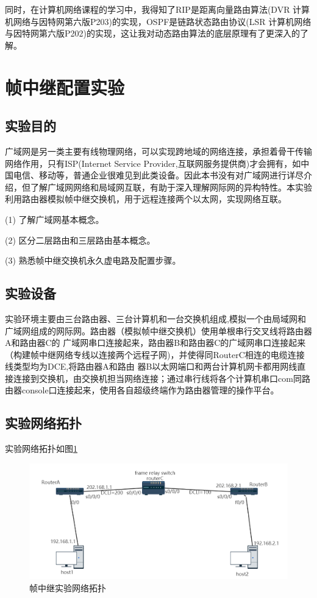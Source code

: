 \documentclass[lang=cn,11pt,a4paper,cite=authoryear]{elegantpaper}
\begin{document}
同时，在计算机网络课程的学习中，我得知了RIP是距离向量路由算法(DVR 计算机网络与因特网第六版P203)的实现，OSPF是链路状态路由协议(LSR 计算机网络与因特网第六版P202)的实现，这让我对动态路由算法的底层原理有了更深入的了解。

\section{帧中继配置实验}
\subsection{实验目的}

广域网是另一类主要有线物理网络，可以实现跨地域的网络连接，承担着骨干传输网络作用，只有ISP(Internet Service Provider,互联网服务提供商)才会拥有，如中国电信、移动等，普通企业很难见到此类设备。因此本书没有对广域网进行详尽介绍，但了解广域网网络和局域网互联，有助于深入理解网际网的异构特性。本实验利用路由器模拟帧中继交换机，用于远程连接两个以太网，实现网络互联。

(1)	了解广域网基本概念。

(2)	区分二层路由和三层路由基本概念。

(3)	熟悉帧中继交换机永久虚电路及配置步骤。

\subsection{实验设备}

实验环境主要由三台路由器、三台计算机和一台交换机组成,模拟一个由局域网和广域网组成的网际网。路由器（模拟帧中继交换机）使用单根串行交叉线将路由器A和路由器C的 广域网串口连接起来，路由器B和路由器C的广域网串口连接起来（构建帧中继网络专线以连接两个远程子网)，并使得同RouterC相连的电缆连接线类型均为DCE,将路由器A和路由 器B以太网端口和两台计算机网卡都用网线直接连接到交换机，由交换机担当网络连接；通过串行线将各个计算机串口com同路由器console口连接起来，使用各自超级终端作为路由器管理的操作平台。

\subsection{实验网络拓扑}


实验网络拓扑如图\ref{fig:screenshot025}

\begin{figure}[htbp]
	\centering
	\includegraphics[width=0.7\linewidth]{image/screenshot025}
	\caption{帧中继实验网络拓扑}
	\label{fig:screenshot025}
\end{figure}
\end{document}

